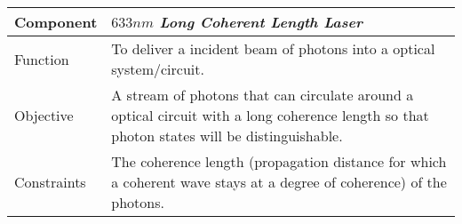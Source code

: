 \begin{center}
    \begin{tabular}{|m{6em}|m{12cm}|}
    \hline
    \textbf{Component} & \textit{$633 \si{nm}$ Long Coherent Length Laser} \\
    \hline 
    Function & To deliver a incident beam of photons into a optical system/circuit. \\ 
    \hline
    Objective & A stream of photons that can circulate around a optical circuit with a long coherence length so that photon states will be distinguishable. \\
    \hline
    Constraints &  The coherence length (propagation distance for which a coherent wave stays at a degree of coherence) of the photons. \\
    \hline
    \end{tabular}
\end{center}